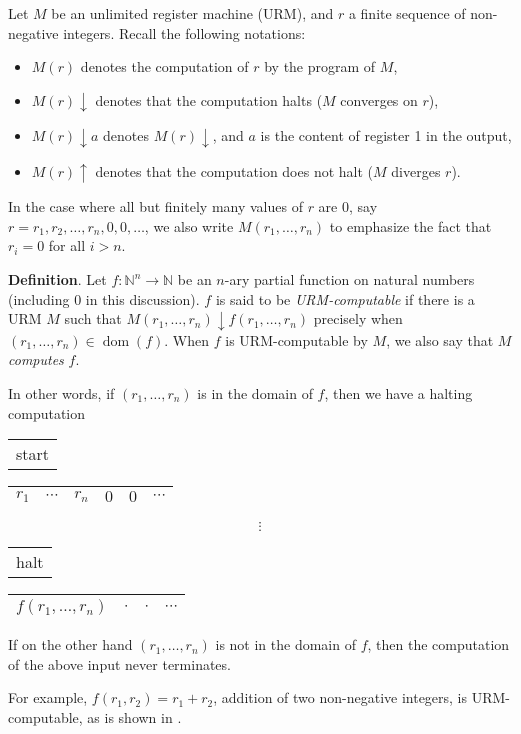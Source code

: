 \documentclass[12pt]{article}
\begin{document}
Let $M$ be an unlimited register machine (URM), and $r$ a finite sequence of non-negative integers.  Recall the following notations:
\begin{itemize}
\item $M(r)$ denotes the computation of $r$ by the program of $M$,
\item $M(r)\!\downarrow$ denotes that the computation halts ($M$ converges on $r$),
\item $M(r)\!\downarrow a$ denotes $M(r)\!\downarrow$, and $a$ is the content of register 1 in the output,
\item $M(r)\!\uparrow$ denotes that the computation does not halt ($M$ diverges $r$).
\end{itemize}
In the case where all but finitely many values of $r$ are $0$, say $r=r_1, r_2, \ldots, r_n, 0, 0, \ldots$, we also write $M(r_1,\ldots,r_n)$ to emphasize the fact that $r_i=0$ for all $i>n$.

\textbf{Definition}.  Let $f: \mathbb{N}^n \to \mathbb{N}$ be an $n$-ary partial function on natural numbers (including $0$ in this discussion).  $f$ is said to be \emph{URM-computable} if there is a URM $M$ such that $M(r_1,\ldots,r_n)\!\downarrow f(r_1,\ldots, r_n)$ precisely when $(r_1,\ldots,r_n)\in \operatorname{dom}(f)$.  When $f$ is URM-computable by $M$, we also say that $M$ \emph{computes} $f$.

In other words, if $(r_1,\ldots, r_n)$ is in the domain of $f$, then we have a halting computation 
\begin{center}
\begin{tabular}{ p{0.7cm} }
start
\end{tabular}
\begin{tabular}{|c|c|c|c|c|c}
\hline
$r_1$ & $\cdots$ & $r_n$ & $0$ & $0$ & $\cdots$ \\
\hline
\end{tabular}
$$\vdots$$
\begin{tabular}{ p{0.5cm} }
halt
\end{tabular}
\begin{tabular}{|c|c|c|c}
\hline
$f(r_1,\ldots,r_n)$ & $\cdot$ & $\cdot$ & $\cdots$ \\
\hline
\end{tabular}
\end{center}
If on the other hand $(r_1,\ldots, r_n)$ is not in the domain of $f$, then the computation of the above input never terminates.

For example, $f(r_1,r_2)=r_1+r_2$, addition of two non-negative integers, is URM-computable, as is shown in .
\end{document}
